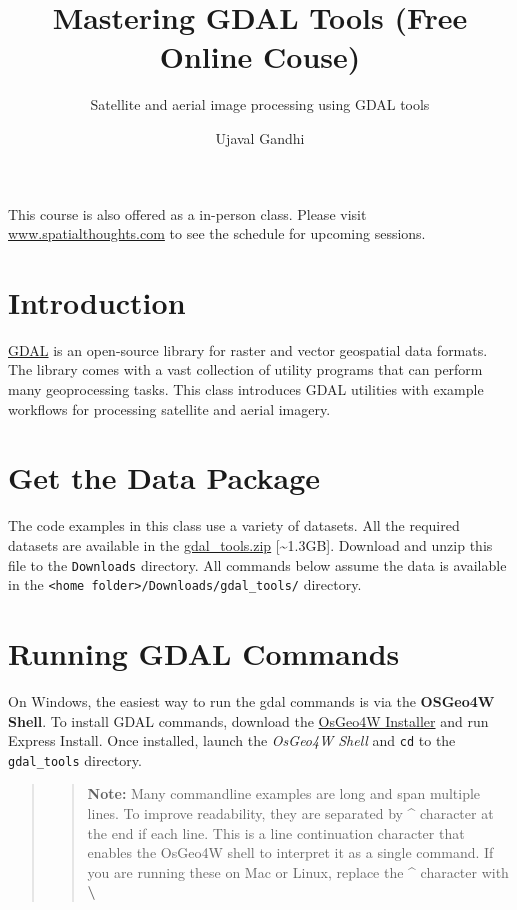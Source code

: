 \documentclass[12pt,a4paper]{article}
\title{Mastering GDAL Tools (Free Online Couse)}
\subtitle{Satellite and aerial image processing using GDAL tools}
\author{Ujaval Gandhi}
\date{}
\begin{document}
\maketitle

{
\setcounter{tocdepth}{3}
\tableofcontents
}
\newpage

This course is also offered as a in-person class. Please visit
\href{https://spatialthoughts.com}{www.spatialthoughts.com} to see the
schedule for upcoming sessions.

\newpage

\hypertarget{introduction}{%
\section{Introduction}\label{introduction}}

\href{https://gdal.org/}{GDAL} is an open-source library for raster and
vector geospatial data formats. The library comes with a vast collection
of utility programs that can perform many geoprocessing tasks. This
class introduces GDAL utilities with example workflows for processing
satellite and aerial imagery.

\hypertarget{get-the-data-package}{%
\section{Get the Data Package}\label{get-the-data-package}}

The code examples in this class use a variety of datasets. All the
required datasets are available in the
\href{http://bit.ly/gdal-tools-data}{gdal\_tools.zip}
{[}\textasciitilde1.3GB{]}. Download and unzip this file to the
\texttt{Downloads} directory. All commands below assume the data is
available in the
\texttt{\textless{}home\ folder\textgreater{}/Downloads/gdal\_tools/}
directory.

\hypertarget{running-gdal-commands}{%
\section{Running GDAL Commands}\label{running-gdal-commands}}

On Windows, the easiest way to run the gdal commands is via the
\textbf{OSGeo4W Shell}. To install GDAL commands, download the
\href{https://trac.osgeo.org/osgeo4w/}{OsGeo4W Installer} and run
Express Install. Once installed, launch the \emph{OsGeo4W Shell} and
\texttt{cd} to the \texttt{gdal\_tools} directory.

\begin{quote}
\begin{quote}
\textbf{Note:} Many commandline examples are long and span multiple
lines. To improve readability, they are separated by \textbf{\^{}}
character at the end if each line. This is a line continuation character
that enables the OsGeo4W shell to interpret it as a single command. If
you are running these on Mac or Linux, replace the \textbf{\^{}}
character with \textbf{\textbackslash{}}
\end{quote}
\end{quote}
\end{document}
